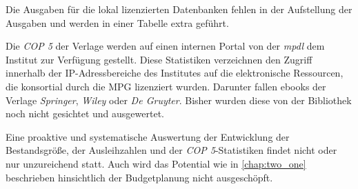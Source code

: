 Die Ausgaben für die lokal lizenzierten Datenbanken fehlen in der Aufstellung der Ausgaben und werden in einer Tabelle extra geführt.

Die \textit{\acrfull{COP 5}} der Verlage werden auf einen internen Portal von der \textit{\acrshort{mpdl}} dem Institut zur Verfügung gestellt.
Diese Statistiken verzeichnen den Zugriff innerhalb der IP-Adressbereiche des Institutes auf die elektronische Ressourcen, 
die konsortial durch die \acrshort{MPG} lizenziert wurden. Darunter fallen ebooks der Verlage 
\textit{Springer}, \textit{Wiley} oder \textit{De Gruyter}. Bisher wurden diese von der Bibliothek noch nicht gesichtet und ausgewertet.

Eine proaktive und systematische Auswertung der Entwicklung der Bestandsgröße, der Ausleihzahlen und der \textit{\acrshort{COP 5}}-Statistiken findet nicht
oder nur unzureichend statt. Auch wird das Potential wie in \autoref{chap:two_one} beschrieben hinsichtlich der Budgetplanung
nicht ausgeschöpft.


